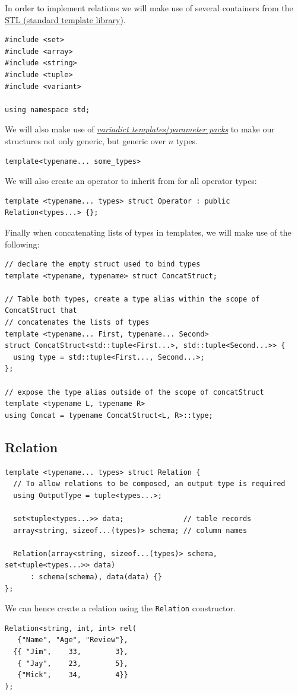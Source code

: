 In order to implement relations we will make use of several containers from the 
\href{https://en.wikipedia.org/wiki/Standard_Template_Library}{STL (standard template library)}.
\begin{verbatim}
#include <set>
#include <array>
#include <string>
#include <tuple>
#include <variant>

using namespace std;
\end{verbatim}
We will also make use of \href{https://en.cppreference.com/w/cpp/language/parameter_pack}{\textit{variadict templates}/\textit{parameter packs}} to make our structures not only generic, but generic over $n$ types.
\begin{verbatim}
template<typename... some_types>
\end{verbatim}
We will also create an operator to inherit from for all operator types:
\begin{verbatim}
template <typename... types> struct Operator : public Relation<types...> {};
\end{verbatim}

Finally when concatenating lists of types in templates, we will make use of the following:
\begin{verbatim}
// declare the empty struct used to bind types
template <typename, typename> struct ConcatStruct;

// Table both types, create a type alias within the scope of ConcatStruct that 
// concatenates the lists of types 
template <typename... First, typename... Second>
struct ConcatStruct<std::tuple<First...>, std::tuple<Second...>> {
  using type = std::tuple<First..., Second...>;
};

// expose the type alias outside of the scope of concatStruct 
template <typename L, typename R>
using Concat = typename ConcatStruct<L, R>::type;
\end{verbatim}

\subsection{Relation}
\begin{verbatim}
template <typename... types> struct Relation {
  // To allow relations to be composed, an output type is required
  using OutputType = tuple<types...>;

  set<tuple<types...>> data;              // table records
  array<string, sizeof...(types)> schema; // column names

  Relation(array<string, sizeof...(types)> schema, set<tuple<types...>> data)
      : schema(schema), data(data) {}
};
\end{verbatim}
\noindent
We can hence create a relation using the \texttt{Relation} constructor.
\begin{verbatim}
Relation<string, int, int> rel(
   {"Name", "Age", "Review"},
  {{ "Jim",    33,        3}, 
   { "Jay",    23,        5}, 
   {"Mick",    34,        4}}
);
\end{verbatim}


